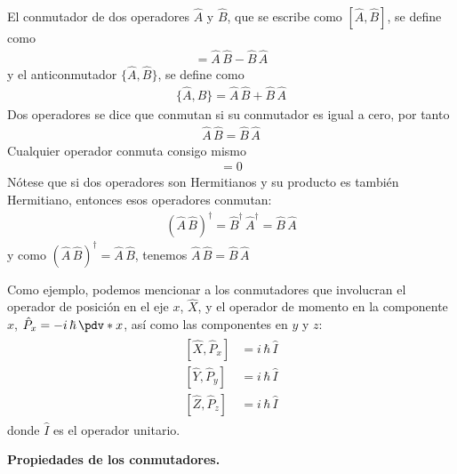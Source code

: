 El conmutador de dos operadores $\hat{A}$  y $\hat{B}$, que se escribe como $[\hat{A}, \hat{B}]$, se define como
\begin{align}
[\hat{A}, \hat{B}] = \hat{A} \, \hat{B} - \hat{B} \, \hat{A}
\label{eq:ecuacion_02_79}
\end{align}
y el anticonmutador $\{ \hat{A}, \hat{B} \}$, se define como
\begin{align}
\{ \hat{A}, \hat{B} \} = \hat{A} \, \hat{B} + \hat{B} \, \hat{A}
\label{eq:ecuacion_02_80}
\end{align}
Dos operadores se dice que conmutan si su conmutador es igual a cero, por tanto
\begin{align*}
\hat{A} \, \hat{B} = \hat{B} \, \hat{A}
\end{align*}
Cualquier operador conmuta consigo mismo
\begin{align}
[\hat{A}, \hat{A}] = 0
\label{eq:ecuacion_02_81}
\end{align}
Nótese que si dos operadores son Hermitianos y su producto es también Hermitiano, entonces esos operadores conmutan:
\begin{align}
(\hat{A} \, \hat{B})^{\dagger} = \hat{B}^{\dagger} \, \hat{A}^{\dagger} = \hat{B} \, \hat{A}
\label{eq:ecuacion_02_82}
\end{align}
y como $(\hat{A} \, \hat{B})^{\dagger} = \hat{A} \, \hat{B}$, tenemos $\hat{A} \, \hat{B} = \hat{B} \, \hat{A}$
\par
Como ejemplo, podemos mencionar a los conmutadores que involucran el operador de posición en el eje $x$, $\hat{X}$, y el operador de momento en la componente $x$, $\hat{P}_{x} = - i \, \hbar \, \pdv*{x}$, así como las componentes en $y$ y $z$:
\begin{align}
\begin{aligned}
[\hat{X}, \hat{P}_{x}] &= i \, \hbar \, \hat{I} \\
[\hat{Y}, \hat{P}_{y}] &= i \, \hbar \, \hat{I} \\
[\hat{Z}, \hat{P}_{z}] &= i \, \hbar \, \hat{I}
\end{aligned}
\label{eq:ecuacion_02_83}
\end{align}
donde $\hat{I}$ es el operador unitario.

\textbf{Propiedades de los conmutadores.}

